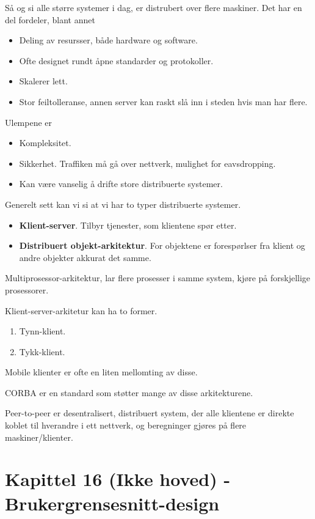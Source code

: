 \documentclass[11pt]{article}
\begin{document}
  Så og si alle større systemer i dag, er distrubert over flere maskiner. Det har en del fordeler, blant annet

\begin{itemize}
\item Deling av resursser, både hardware og software.
\item Ofte designet rundt åpne standarder og protokoller.
\item Skalerer lett.
\item Stor feiltolleranse, annen server kan raskt slå inn i steden hvis man har flere.
\end{itemize}

  Ulempene er

\begin{itemize}
\item Kompleksitet.
\item Sikkerhet.
    Traffiken må gå over nettverk, mulighet for eavsdropping.
\item Kan være vanselig å drifte store distribuerte systemer.
\end{itemize}

  Generelt sett kan vi si at vi har to typer distribuerte systemer.

\begin{itemize}
\item \textbf{Klient-server}. Tilbyr tjenester, som klientene spør etter.
\item \textbf{Distribuert objekt-arkitektur}. For objektene er forespørlser fra klient og andre objekter akkurat det samme.
\end{itemize}

  Multiprosessor-arkitektur, lar flere prosesser i samme system, kjøre på forskjellige prosessorer.

  Klient-server-arkitetur kan ha to former.

\begin{enumerate}
\item Tynn-klient.
\item Tykk-klient.
\end{enumerate}

  Mobile klienter er ofte en liten mellomting av disse.

  CORBA er en standard som støtter mange av disse arkitekturene.

  Peer-to-peer er desentralisert, distribuert system, der alle klientene er direkte
  koblet til hverandre i ett nettverk, og beregninger gjøres på flere maskiner/klienter.
\section{Kapittel 16 (Ikke hoved) - Brukergrensesnitt-design}
\label{sec-14}
\end{document}
